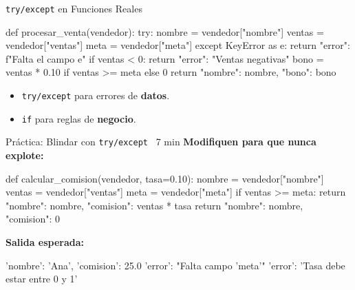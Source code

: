 \documentclass[aspectratio=169, 11pt]{beamer}
\begin{document}
\begin{frame}[fragile,shrink=28]{\texttt{try/except} en Funciones Reales}
  \vspace{-6pt}
  \begin{pyblock}
def procesar_venta(vendedor):
    try:
        nombre = vendedor["nombre"]
        ventas = vendedor["ventas"]
        meta = vendedor["meta"]
    except KeyError as e:
        return {"error": f"Falta el campo {e}"}
    if ventas < 0:
        return {"error": "Ventas negativas"}
    bono = ventas * 0.10 if ventas >= meta else 0
    return {"nombre": nombre, "bono": bono}
  \end{pyblock}

  \vspace{4pt}
  {\scriptsize\color{textMuted}
  \begin{itemize}\setlength{\itemsep}{3pt}
    \item[{\color{arcaRed}\scriptsize\faArrowRight}]
      \texttt{try/except} para errores de \textbf{datos}.
    \item[{\color{arcaRed}\scriptsize\faArrowRight}]
      \texttt{if} para reglas de \textbf{negocio}.
  \end{itemize}
  }
\end{frame}

\begin{frame}[fragile,shrink=28]{Práctica: Blindar con \texttt{try/except} \hfill
    {\normalsize\color{arcaRed}\faClock\ 7 min}}
  \vspace{-6pt}
  {\footnotesize\color{arcaDark}\bfseries
    Modifiquen para que nunca explote:}

  \vspace{4pt}
  \begin{pyblock}
def calcular_comision(vendedor, tasa=0.10):
    nombre = vendedor["nombre"]
    ventas = vendedor["ventas"]
    meta   = vendedor["meta"]
    if ventas >= meta:
        return {"nombre": nombre, "comision": ventas * tasa}
    return {"nombre": nombre, "comision": 0}
  \end{pyblock}

  \vspace{4pt}
  {\scriptsize\color{textMuted}\bfseries Salida esperada:}
  \begin{outputblock}[minted options={fontsize=\scriptsize, breaklines}]
{'nombre': 'Ana', 'comision': 25.0}
{'error': "Falta campo 'meta'"}
{'error': 'Tasa debe estar entre 0 y 1'}
  \end{outputblock}
\end{frame}
\end{document}
